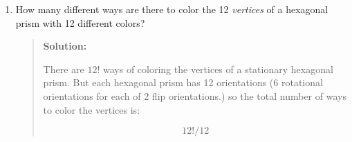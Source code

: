 \documentclass[10pt,letterpaper,unboxed,cm]{article}
\begin{document}
\begin{enumerate}
\begin{enumerate}
$$\frac{(12+8+11)!}{12!\,8!\,11!} = \frac{31!}{12!\,8!\,11!}$$


\item


How many different ways are there to color the 12 \emph{vertices} of a hexagonal prism with 12 different colors?


\begin{quote}
{\bf Solution:}

There are $12!$ ways of coloring the vertices of a stationary hexagonal prism. But each hexagonal prism has 12 orientations (6 rotational orientations for each of 2 flip orientations.) so the total number of ways to color the vertices is:

$$12!/12$$
\end{quote}
\end{enumerate}



\end{enumerate}
\end{document}
